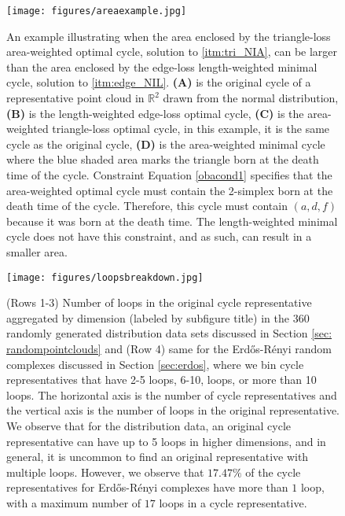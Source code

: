 \begin{figure}[h!]
\begin{center}
\texttt{[image: figures/areaexample.jpg]}
\end{center}
\caption{An example illustrating when the area enclosed by the triangle-loss area-weighted optimal cycle, solution to \pr \ref{itm:tri_NIA}, can be larger than the area enclosed by the edge-loss length-weighted minimal cycle, solution to \pr \ref{itm:edge_NIL}. \textbf{(A)} is the original cycle of a representative point cloud in $\mathbb{R}^2$ drawn from the normal distribution, \textbf{(B)} is the length-weighted edge-loss optimal cycle, \textbf{(C)} is the area-weighted triangle-loss optimal cycle, in this example, it is the same cycle as the original cycle, \textbf{(D)} is the area-weighted minimal cycle where the blue shaded area marks the triangle born at the death time of the cycle.  
Constraint Equation \eqref{obacond1} specifies that the area-weighted optimal cycle must contain the 2-simplex born at the death time of the cycle. Therefore, this cycle must contain $(a,d,f)$ because it was born at the death time. The length-weighted minimal cycle does not have this constraint, and as such, can result in a smaller area. 
}\label{fig:areaExample}
\end{figure}


 \begin{figure}[h!]
\begin{center}
\texttt{[image: figures/loopsbreakdown.jpg]}
\end{center}
\caption{  
(Rows 1-3) Number of loops in the original cycle representative aggregated by dimension (labeled by subfigure title) in the  $360$ randomly generated distribution data sets discussed in Section \ref{sec: randompointclouds} and (Row 4) same for the  Erd\H{o}s-R\'enyi random complexes discussed in Section \ref{sec:erdos}, where we bin cycle representatives that have 2-5 loops, 6-10, loops, or more than 10 loops. The horizontal axis is the number of cycle representatives and the vertical axis is the number of loops in the original representative. We observe that for the distribution data, an original cycle representative can have up to 5 loops in higher dimensions, and in general, it is uncommon to find an original representative with multiple loops. However, we observe that $17.47\%$ of the cycle representatives for Erd\H{o}s-R\'enyi complexes have more than $1$ loop, with a maximum number of $17$ loops in a cycle representative.}
\label{fig:loopsbreakdown}
\end{figure} 

